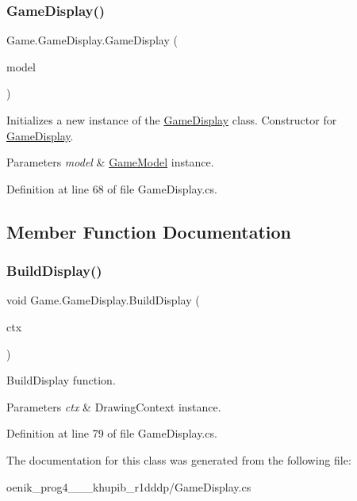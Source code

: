 \subsubsection{\texorpdfstring{GameDisplay()}{GameDisplay()}}
{\footnotesize\ttfamily Game.\+Game\+Display.\+Game\+Display (\begin{DoxyParamCaption}\item[{\mbox{\hyperlink{class_game_1_1_game_model}{Game\+Model}}}]{model }\end{DoxyParamCaption})}



Initializes a new instance of the \mbox{\hyperlink{class_game_1_1_game_display}{Game\+Display}} class. Constructor for \mbox{\hyperlink{class_game_1_1_game_display}{Game\+Display}}. 


\begin{DoxyParams}{Parameters}
{\em model} & \mbox{\hyperlink{class_game_1_1_game_model}{Game\+Model}} instance.\\
\hline
\end{DoxyParams}


Definition at line 68 of file Game\+Display.\+cs.



\subsection{Member Function Documentation}
\mbox{\label{class_game_1_1_game_display_a9dfba504af8f3a89c393519a4ad88c7f}} 
\subsubsection{\texorpdfstring{BuildDisplay()}{BuildDisplay()}}
{\footnotesize\ttfamily void Game.\+Game\+Display.\+Build\+Display (\begin{DoxyParamCaption}\item[{Drawing\+Context}]{ctx }\end{DoxyParamCaption})}



Build\+Display function. 


\begin{DoxyParams}{Parameters}
{\em ctx} & Drawing\+Context instance.\\
\hline
\end{DoxyParams}


Definition at line 79 of file Game\+Display.\+cs.



The documentation for this class was generated from the following file\+:\begin{DoxyCompactItemize}
\item 
oenik\+\_\+prog4\+\_\+\_\+\_\+khupib\+\_\+r1dddp/Game\+Display.\+cs\end{DoxyCompactItemize}
